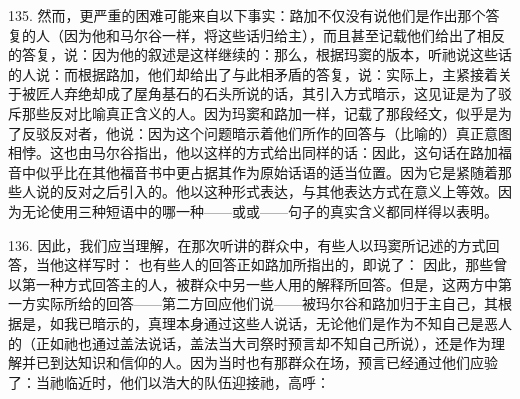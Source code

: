 135. 然而，更严重的困难可能来自以下事实：路加不仅没有说他们是作出那个答复的人（因为他和马尔谷一样，将这些话归给主），而且甚至记载他们给出了相反的答复，说：因为他的叙述是这样继续的：那么，根据玛窦的版本，听祂说这些话的人说：而根据路加，他们却给出了与此相矛盾的答复，说：实际上，主紧接着关于被匠人弃绝却成了屋角基石的石头所说的话，其引入方式暗示，这见证是为了驳斥那些反对比喻真正含义的人。因为玛窦和路加一样，记载了那段经文，似乎是为了反驳反对者，他说：因为这个问题暗示着他们所作的回答与（比喻的）真正意图相悖。这也由马尔谷指出，他以这样的方式给出同样的话：因此，这句话在路加福音中似乎比在其他福音书中更占据其作为原始话语的适当位置。因为它是紧随着那些人说的反对之后引入的。他以这种形式表达，与其他表达方式在意义上等效。因为无论使用三种短语中的哪一种——或或——句子的真实含义都同样得以表明。\par

136. 因此，我们应当理解，在那次听讲的群众中，有些人以玛窦所记述的方式回答，当他这样写时： 也有些人的回答正如路加所指出的，即说了： 因此，那些曾以第一种方式回答主的人，被群众中另一些人用的解释所回答。但是，这两方中第一方实际所给的回答——第二方回应他们说——被玛尔谷和路加归于主自己，其根据是，如我已暗示的，真理本身通过这些人说话，无论他们是作为不知自己是恶人的（正如祂也通过盖法说话，盖法当大司祭时预言却不知自己所说），还是作为理解并已到达知识和信仰的人。因为当时也有那群众在场，预言已经通过他们应验了：当祂临近时，他们以浩大的队伍迎接祂，高呼：\par

